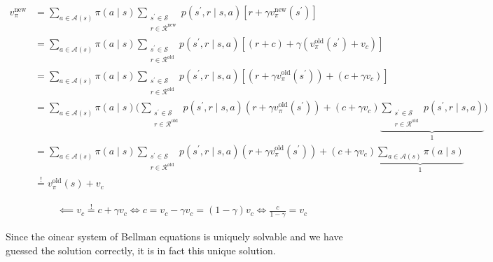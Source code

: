 \begin{solution}
\begin{enumerate}[label = \arabic*.]
    \begin{align*}
        v_\pi^\text{new}
        & =
        \sum_{a \in \mathcal A(s)}
            \pi(a \mid s)
            \sum_{\substack{s^\prime \in \mathcal S \\ r \in \mathcal R^\text{new}}}
                p(s^\prime, r \mid s, a)
                [r + \gamma v_\pi^\text{new}(s^\prime)] \\
        & =
        \sum_{a \in \mathcal A(s)}
            \pi(a \mid s)
            \sum_{\substack{s^\prime \in \mathcal S \\ r \in \mathcal R^\text{old}}}
                p(s^\prime, r \mid s, a)
                [(r + c) + \gamma (v_\pi^\text{old}(s^\prime) + v_c)] \\
        & =
        \sum_{a \in \mathcal A(s)}
            \pi(a \mid s)
            \sum_{\substack{s^\prime \in \mathcal S \\ r \in \mathcal R^\text{old}}}
                p(s^\prime, r \mid s, a)
                [(r + \gamma v_\pi^\text{old}(s^\prime)) + (c + \gamma v_c)] \\
        & =
        \sum_{a \in \mathcal A(s)}
            \pi(a \mid s)
            \Bigg (
                \sum_{\substack{s^\prime \in \mathcal S \\ r \in \mathcal R^\text{old}}}
                    p(s^\prime, r \mid s, a)
                    (r + \gamma v_\pi^\text{old}(s^\prime))
                +
                (c + \gamma v_c)
                \underbrace
                {
                    \sum_{\substack{s^\prime \in \mathcal S \\ r \in \mathcal R^\text{old}}}
                        p(s^\prime, r \mid s, a)
                }_1
            \Bigg ) \\
        & =
        \sum_{a \in \mathcal A(s)}
            \pi(a \mid s)
            \sum_{\substack{s^\prime \in \mathcal S \\ r \in \mathcal R^\text{old}}}
                p(s^\prime, r \mid s, a)
                (r + \gamma v_\pi^\text{old}(s^\prime))
        +
        (c + \gamma v_c)
        \underbrace
        {
            \sum_{a \in \mathcal A(s)}
                \pi(a \mid s)
        }_1 \\
        & \stackrel{!}{=}
        v_\pi^\text{old}(s) + v_c
    \end{align*}

    \begin{align*}
        \impliedby
        v_c \stackrel{!}{=} c + \gamma v_c
        \iff
        c = v_c - \gamma v_c = (1 - \gamma) v_c
        \iff
        \frac{c}{1 - \gamma} = v_c
    \end{align*}

    Since the oinear system of Bellman equations is uniquely solvable and we have guessed the solution correctly, it is in fact this unique solution.

\end{enumerate}

\end{solution}

